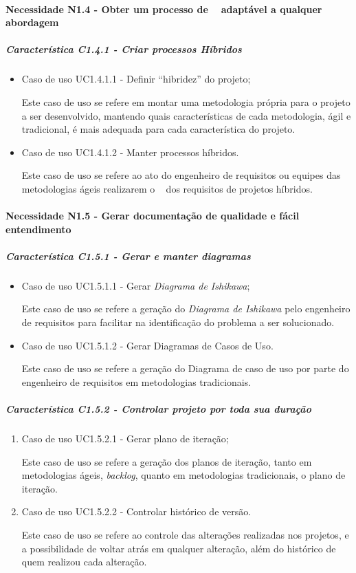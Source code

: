 \paragraph{Necessidade N1.4 - Obter um processo de \er~ adaptável a qualquer abordagem}
	\subparagraph{Característica C1.4.1 - Criar processos Híbridos}
		\begin{itemize}
			
			\item Caso de uso UC1.4.1.1 - Definir ``hibridez'' do projeto;

				Este caso de uso se refere em montar uma metodologia própria para o projeto a ser desenvolvido, mantendo quais características de cada metodologia, ágil e tradicional, é mais adequada para cada característica do projeto.
			
			\item Caso de uso UC1.4.1.2 - Manter processos híbridos.

				Este caso de uso se refere ao ato do engenheiro de requisitos ou equipes das metodologias ágeis realizarem o \CRUD~ dos requisitos de projetos híbridos.
		\end{itemize}

\paragraph{Necessidade N1.5 - Gerar documentação de qualidade e fácil entendimento}
	\subparagraph{Característica C1.5.1 - Gerar e manter diagramas}
		\begin{itemize}
			
			\item Caso de uso UC1.5.1.1 - Gerar \textit{Diagrama de Ishikawa};

				Este caso de uso se refere a geração do \textit{Diagrama de Ishikawa} pelo engenheiro de requisitos para facilitar na identificação do problema a ser solucionado. 
			
			\item Caso de uso UC1.5.1.2 - Gerar Diagramas de Casos de Uso.

				Este caso de uso se refere a geração do Diagrama de caso de uso por parte do engenheiro de requisitos em metodologias tradicionais.
		\end{itemize}

	\subparagraph{Característica C1.5.2 - Controlar projeto por toda sua duração}
		\begin{enumerate}
			
			\item Caso de uso UC1.5.2.1 - Gerar plano de iteração;

				Este caso de uso se refere a geração dos planos de iteração, tanto em metodologias ágeis, \textit{backlog}, quanto em metodologias tradicionais, o plano de iteração.
			
			\item Caso de uso UC1.5.2.2 - Controlar histórico de versão.

				Este caso de uso se refere ao controle das alterações realizadas nos projetos, e a possibilidade de voltar atrás em qualquer alteração, além do histórico de quem realizou cada alteração.
		\end{enumerate}

